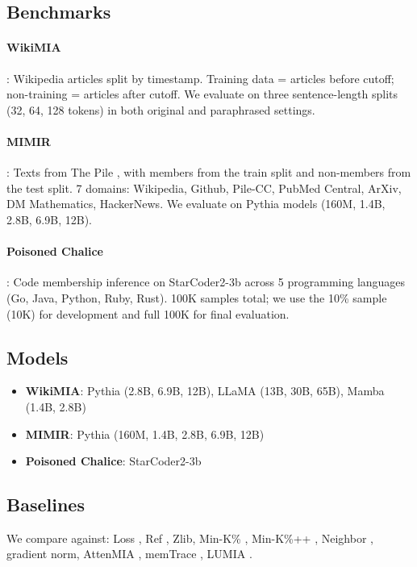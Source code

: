 \documentclass[11pt]{article}
\begin{document}
\subsection{Benchmarks}

\paragraph{WikiMIA} \citep{shi2024detecting}: Wikipedia articles split by timestamp.
Training data = articles before cutoff; non-training = articles after cutoff.
We evaluate on three sentence-length splits (32, 64, 128 tokens) in both original and paraphrased settings.

\paragraph{MIMIR} \citep{duan2024membership}: Texts from The Pile \citep{gao2020pile}, with members from the train split and non-members from the test split.
7 domains: Wikipedia, Github, Pile-CC, PubMed Central, ArXiv, DM Mathematics, HackerNews.
We evaluate on Pythia models (160M, 1.4B, 2.8B, 6.9B, 12B).

\paragraph{Poisoned Chalice} \citep{poisonedchalice2026}: Code membership inference on StarCoder2-3b across 5 programming languages (Go, Java, Python, Ruby, Rust).
100K samples total; we use the 10\% sample (10K) for development and full 100K for final evaluation.

\subsection{Models}

\begin{itemize}
    \item \textbf{WikiMIA}: Pythia (2.8B, 6.9B, 12B), LLaMA (13B, 30B, 65B), Mamba (1.4B, 2.8B)
    \item \textbf{MIMIR}: Pythia (160M, 1.4B, 2.8B, 6.9B, 12B)
    \item \textbf{Poisoned Chalice}: StarCoder2-3b
\end{itemize}

\subsection{Baselines}

We compare against: Loss \citep{yeom2018privacy}, Ref \citep{carlini2021extracting}, Zlib, Min-K\% \citep{shi2024detecting}, Min-K\%++ \citep{zhang2024minkpp}, Neighbor \citep{mattern2023neighbor}, gradient norm, AttenMIA \citep{wang2025attenmia}, memTrace \citep{makhija2025memtrace}, LUMIA \citep{ibanez2024lumia}.
\end{document}

